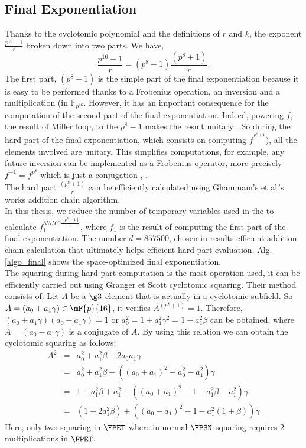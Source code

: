 \subsection{Final Exponentiation}
Thanks to the cyclotomic polynomial and the definitions of $r$ and $k$, the exponent $\frac{p^{16}-1}{r}$  broken down into two parts. We have,
$$\frac{p^{16}-1}{r}=(p^8-1)\frac{(p^8+1)}{r}.$$
The first part, $(p^8-1)$ is the simple part of the final exponentiation
because it is easy to be performed thanks to a Frobenius operation, an inversion and a multiplication (in $\mathbb{F}_{p^{16}}$. 
However, it has an important consequence for the computation of the second part of the final exponentiation. 
Indeed, powering $f$, the result of Miller loop,  to the ${p^8-1}$ makes the result unitary \cite{C:ScoBar04}. So during the hard part of the final exponentiation, which consists on computing $f^{\frac{p^8+1}{r}}$), all the elements involved are unitary.
This  simplifies computations, for example, any future inversion can be implemented as a Frobenius operator, more precisely $f^{-1}=f^{p^8}$ which is just a conjugation \cite{C:ScoBar04}, \cite{CHES:StaLen02}. \\
The hard part $\frac{(p^8+1)}{r}$ can be efficiently calculated using Ghammam's et al.'s works \cite{EPRINT:GhaFou16b} addition chain algorithm.\\
In this thesis, we  reduce the number of temporary variables used in the  \cite{EPRINT:GhaFou16b} to calculate $f_1^{857500{\frac{(p^8+1)}{r}}}$, where   $f_1 $ is the result of computing the first part of the final exponentiation. 
The  number $d=857500$, chosen in  \cite{EPRINT:GhaFou16b}  results efficient addition chain calculation  that ultimately helps efficient hard part evaluation.
Alg. \ref{algo_final}  shows the space-optimized final exponentiation. \\
The squaring during hard part computation is the most operation used, it can be efficiently carried out using Granger et Scott  \cite{PKC:GraSco10} cyclotomic squaring. Their method consists of:
Let $A$ be a $\g3$ element that is actually  in a cyclotomic subfield.  So $A = (a_0+a_1\gamma) \in \mF{p}{16}$, it verifies $A^{(p^8+1)}=1$. Therefore,  $(a_0+a_1\gamma) (a_0-a_1\gamma)=1$ or $a_0^2=1+a_1^2\gamma^2 =  1+a_1^2\beta$ can be obtained, where  $\bar{A}=(a_0-a_1\gamma)$ is a conjugate of $A$. 
By using this relation we can obtain the cyclotomic squaring as follows:
\begin{eqnarray}
A^2& = &a_0^2+a_1^2 \beta+2a_0a_1\gamma \nonumber \\
&  = & a_0^2+a_1^2 \beta +((a_0+a_1)^2-a_0^2 -a_1^2)  \gamma\nonumber \\
&=& 1+ a_1^2 \beta + a_1^2 + ((a_0+a_1)^2- 1-a_1^2\beta -a_1^2)\gamma \nonumber \\
&=&  (1+ 2a_1^2 \beta)  + ((a_0+a_1)^2- 1-a_1^2(1+\beta) )\gamma \nonumber 
\end{eqnarray}
Here, only two squaring in $\FPET$ where in normal $\FPSN$ squaring requires 2 multiplications in $\FPET$.

